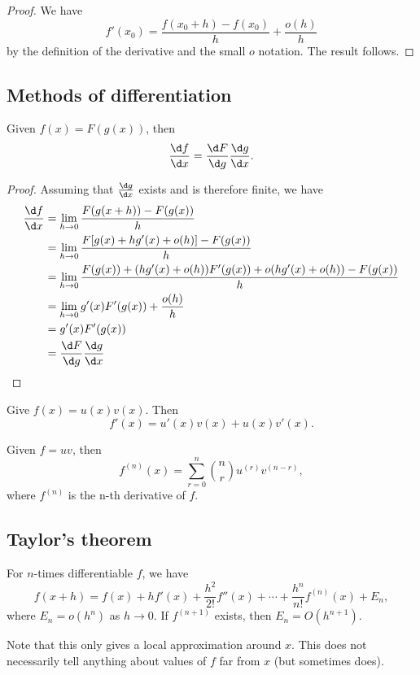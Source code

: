 \documentclass[a4paper]{article}
\begin{document}
\begin{proof}
  We have
  \[
    f'(x_0) = \frac{f(x_0 + h) - f(x_0)}{h} + \frac{o(h)}{h}
  \]
  by the definition of the derivative and the small $o$ notation. The result follows.
\end{proof}

\subsection{Methods of differentiation}
\begin{thm}
  Given $f(x) = F(g(x))$, then
  \[
    \frac{\d f}{\d x} = \frac{\d F}{\d g}\frac{\d g}{\d x}.
  \]
\end{thm}

\begin{proof}
  Assuming that $\frac{\d g}{\d x}$ exists and is therefore finite, we have
  \begin{align*}
    \frac{\d f}{\d x} &= \lim_{h\to 0}\frac{F(g(x + h)) - F(g(x))}{h}\\
    &= \lim_{h\to 0}\frac{F[g(x) + hg'(x) + o(h)] - F(g(x))}{h}\\
    &= \lim_{h\to 0}\frac{F(g(x)) + (hg'(x) + o(h))F'(g(x)) + o(hg'(x) + o(h)) - F(g(x))}{h}\\
    &= \lim_{h\to 0}g'(x)F'(g(x)) + \frac{o(h)}{h}\\
    &= g'(x)F'(g(x))\\
    &= \frac{\d F}{\d g}\frac{\d g}{\d x}\qedhere
  \end{align*}
\end{proof}

\begin{thm}
  Give $f(x) = u(x)v(x)$. Then
  \[
    f'(x) = u'(x)v(x) + u(x)v'(x).
  \]
\end{thm}

\begin{thm}
  Given $f = uv$, then
  \[
    f^{(n)}(x) = \sum_{r = 0}^n \binom{n}{r}u^{(r)}v^{(n - r)},
  \]
  where $f^{(n)}$ is the n-th derivative of $f$.
\end{thm}

\subsection{Taylor's theorem}
\begin{thm}
  For $n$-times differentiable $f$, we have
  \[
    f(x + h) = f(x) + hf'(x) + \frac{h^2}{2!}f''(x) + \cdots + \frac{h^n}{n!}f^{(n)}(x) + E_n,
  \]
  where $E_n = o(h^{n})$ as $h\to 0$. If $f^{(n+1)}$ exists, then $E_n = O(h^{n+1})$.
\end{thm}
Note that this only gives a local approximation around $x$. This does not necessarily tell anything about values of $f$ far from $x$ (but sometimes does).
\end{document}
